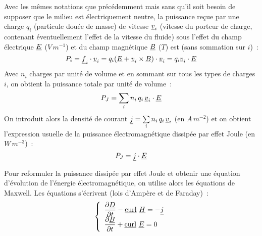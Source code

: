 Avec les mêmes notations que précédemment mais sans qu'il soit
besoin de supposer que le milieu est électriquement neutre,
la puissance reçue par une charge $q_i$ (particule douée de masse)
de vitesse $\underline{v}_i$ (vitesse du porteur de charge, contenant éventuellement
l'effet de la vitesse du fluide) sous l'effet
du champ électrique $\underline{E}$ ($V\,m^{-1}$)
et du champ magnétique  $\underline{B}$ ($T$) est (sans
sommation sur $i$)~:
\begin{equation}
P_i=\underline{f}_i\cdot\underline{v}_i=
q_i(\underline{E}+\underline{v}_i\times\underline{B})\cdot\underline{v}_i
= q_i\underline{v}_i\cdot\underline{E}
\end{equation}
Avec $n_i$ charges par unité de volume et en sommant sur tous les types
de charges $i$, on obtient la puissance totale par unité de volume~:
\begin{equation}
P_J=
\sum\limits_i n_i\,q_i\,\underline{v}_i\cdot\underline{E}
\end{equation}
On introduit alors la densité de courant $\underline{j}=\sum\limits_i n_i\,q_i\,\underline{v}_i$ (en $A\,m^{-2}$) et on obtient l'expression usuelle de la puissance
électromagnétique dissipée par effet Joule (en $W\,m^{-3}$)~:
\begin{equation}
P_J=\underline{j}\cdot\underline{E}
\end{equation}

Pour reformuler la puissance dissipée par effet Joule et obtenir
une équation d'évolution de l'énergie électromagnétique, on utilise
alors les équations de Maxwell.
Les équations s'écrivent (lois d'Ampère
et de Faraday)~:
\begin{equation}
\left\{
\begin{array}{l}
\displaystyle\frac{\partial \underline{D}}{\partial t} - \underline{\text{curl}}\ \underline{H} = -\underline{j}\\
\displaystyle\frac{\partial \underline{B}}{\partial t} + \underline{\text{curl}}\ \underline{E} = 0
\end{array}
\right.
\end{equation}

